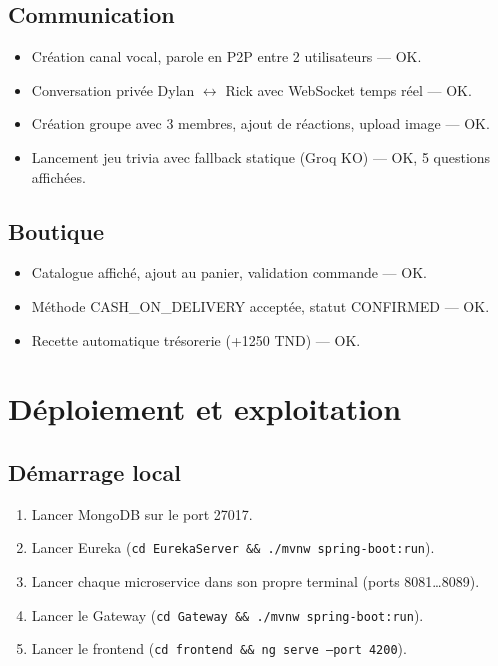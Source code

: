 \documentclass[11pt,a4paper]{report}
\begin{document}
\section{Communication}
\begin{itemize}
  \item Création canal vocal, parole en P2P entre 2 utilisateurs — OK.
  \item Conversation privée Dylan \(\leftrightarrow\) Rick avec WebSocket
        temps réel — OK.
  \item Création groupe avec 3 membres, ajout de réactions, upload image — OK.
  \item Lancement jeu trivia avec fallback statique (Groq KO) — OK, 5
        questions affichées.
\end{itemize}

\section{Boutique}
\begin{itemize}
  \item Catalogue affiché, ajout au panier, validation commande — OK.
  \item Méthode CASH\_ON\_DELIVERY acceptée, statut CONFIRMED — OK.
  \item Recette automatique trésorerie (+1250 TND) — OK.
\end{itemize}


\chapter{Déploiement et exploitation}

\section{Démarrage local}

\begin{enumerate}
  \item Lancer MongoDB sur le port 27017.
  \item Lancer Eureka (\texttt{cd EurekaServer \&\& ./mvnw spring-boot:run}).
  \item Lancer chaque microservice dans son propre terminal (ports 8081\ldots8089).
  \item Lancer le Gateway (\texttt{cd Gateway \&\& ./mvnw spring-boot:run}).
  \item Lancer le frontend (\texttt{cd frontend \&\& ng serve --port 4200}).
\end{enumerate}
\end{document}
